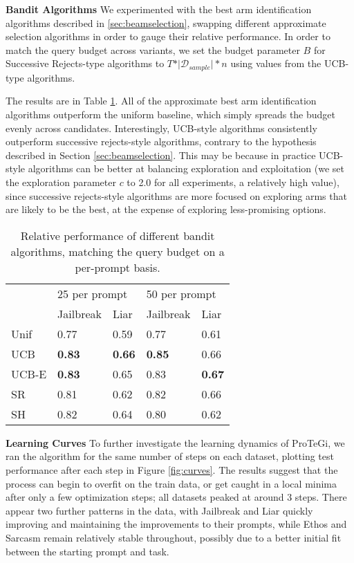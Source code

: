 \textbf{Bandit Algorithms}
We experimented with the best arm identification algorithms described in \ref{sec:beamselection}, swapping different approximate selection algorithms in order to gauge their relative performance. In order to match the query budget across variants, we set the budget parameter $B$ for Successive Rejects-type algorithms to $T * \vert \mathcal{D}_{sample} \vert * n$ using values from the UCB-type algorithms.

The results are in Table \ref{table:bandits}. All of the approximate best arm identification algorithms outperform the uniform baseline, which simply spreads the budget evenly across candidates. Interestingly, UCB-style algorithms consistently outperform successive rejects-style algorithms, contrary to the hypothesis described in Section \ref{sec:beamselection}. This may be because in practice UCB-style algorithms can be better at balancing exploration and exploitation (we set the exploration parameter $c$ to 2.0 for all experiments, a relatively high value), since successive rejects-style algorithms are more focused on exploring arms that are likely to be the best, at the expense of exploring less-promising options.

\begin{table}[]
\begin{tabular}{l|ll|ll}
      & \multicolumn{2}{l|}{25 per prompt} & \multicolumn{2}{l}{50 per prompt} \\
      & Jailbreak          & Liar         & Jailbreak          & Liar         \\ \hline
Unif    &   0.77                 &      0.59        & 0.77               & 0.61         \\
UCB   &   \textbf{0.83}                 &   \textbf{0.66}         & \textbf{0.85}               & 0.66         \\
UCB-E &   \textbf{0.83}                 &        0.65       & 0.83               & \textbf{0.67}         \\
SR    &    0.81                &      0.62         & 0.82               & 0.66         \\
SH  &      0.82              &       0.64        & 0.80               & 0.62        
\end{tabular}
\caption{Relative performance of different bandit algorithms, matching the query budget on a per-prompt basis. }
\label{table:bandits}
\end{table}

\textbf{Learning Curves}
To further investigate the learning dynamics of ProTeGi, we ran the algorithm for the same number of steps on each dataset, plotting test performance after each step in Figure \ref{fig:curves}. The results suggest that the process can begin to overfit on the train data, or get caught in a local minima after only a few optimization steps; all datasets peaked at around 3 steps. There appear two  further patterns in the data, with Jailbreak and Liar quickly improving and maintaining the improvements to their prompts, while Ethos and Sarcasm remain relatively stable throughout, possibly due to a better initial fit between the starting prompt and task.%

